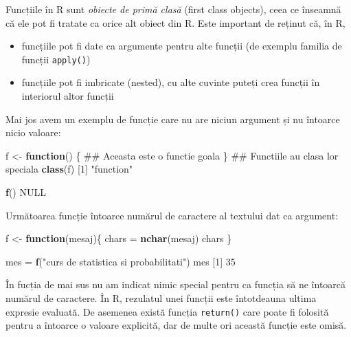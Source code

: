 \documentclass[]{article}
\newenvironment{Shaded}{\begin{snugshade}}{\end{snugshade}}
\newcommand{\KeywordTok}[1]{\textcolor[rgb]{0.13,0.29,0.53}{\textbf{#1}}}
\newcommand{\DecValTok}[1]{\textcolor[rgb]{0.00,0.00,0.81}{#1}}
\newcommand{\StringTok}[1]{\textcolor[rgb]{0.31,0.60,0.02}{#1}}
\newcommand{\OtherTok}[1]{\textcolor[rgb]{0.56,0.35,0.01}{#1}}
\newcommand{\ControlFlowTok}[1]{\textcolor[rgb]{0.13,0.29,0.53}{\textbf{#1}}}
\newcommand{\NormalTok}[1]{#1}
\begin{document}
Funcțiile în R sunt \emph{obiecte de primă clasă} (first class objects),
ceea ce înseamnă că ele pot fi tratate ca orice alt obiect din R. Este
important de reținut că, în R,

\begin{itemize}
\item
  funcțiile pot fi date ca argumente pentru alte funcții (de exemplu
  familia de funcții \texttt{apply()})
\item
  funcțiile pot fi imbricate (nested), cu alte cuvinte puteți crea
  funcții în interiorul altor funcții
\end{itemize}

Mai jos avem un exemplu de funcție care nu are niciun argument și nu
întoarce nicio valoare:

\begin{Shaded}
\begin{Highlighting}[]
\NormalTok{f <-}\StringTok{ }\ControlFlowTok{function}\NormalTok{() \{}
\NormalTok{        ## Aceasta este o functie goala}
\NormalTok{\}}
\NormalTok{## Functiile au clasa lor speciala }
\KeywordTok{class}\NormalTok{(f)  }
\NormalTok{[}\DecValTok{1}\NormalTok{] }\StringTok{"function"}

\KeywordTok{f}\NormalTok{()       }
\OtherTok{NULL}
\end{Highlighting}
\end{Shaded}

Următoarea funcție întoarce numărul de caractere al textului dat ca
argument:

\begin{Shaded}
\begin{Highlighting}[]
\NormalTok{f <-}\StringTok{ }\ControlFlowTok{function}\NormalTok{(mesaj)\{}
\NormalTok{  chars =}\StringTok{ }\KeywordTok{nchar}\NormalTok{(mesaj)}
\NormalTok{  chars}
\NormalTok{\}}

\NormalTok{mes =}\StringTok{ }\KeywordTok{f}\NormalTok{(}\StringTok{"curs de statistica si probabilitati"}\NormalTok{)}
\NormalTok{mes}
\NormalTok{[}\DecValTok{1}\NormalTok{] }\DecValTok{35}
\end{Highlighting}
\end{Shaded}

În fucția de mai sus nu am indicat nimic special pentru ca funcția să ne
întoarcă numărul de caractere. În R, rezulatul unei funcții este
întotdeauna ultima expresie evaluată. De asemenea există funcția
\texttt{return()} care poate fi folosită pentru a întoarce o valoare
explicită, dar de multe ori această funcție este omisă.
\end{document}
